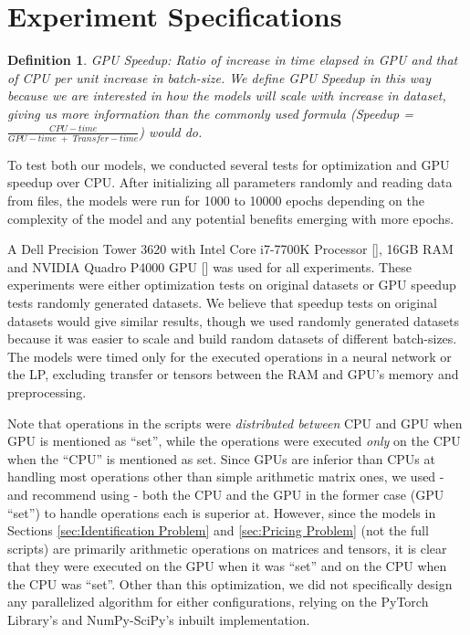 \documentclass[12pt]{article}
\newtheorem{mydef}{Definition}
\begin{document}
    \section{Experiment Specifications} \label{sec:Experiment Specifications}
    \begin{mydef} \label{def:GPU Speedup}
        GPU Speedup: Ratio of increase in time elapsed in GPU and that of CPU per unit increase in batch-size. We define GPU Speedup in this way because we are interested in how the models will scale with increase in dataset, giving us more information than the commonly used formula (Speedup = $\frac{CPU-time}{GPU-time\; +\; Transfer-time}$) would do.
    \end{mydef}
    To test both our models, we conducted several tests for optimization and GPU speedup over CPU. After initializing all parameters randomly and reading data from files, the models were run for 1000 to 10000 epochs depending on the complexity of the model and any potential benefits emerging with more epochs.
    
    A Dell Precision Tower 3620 with Intel Core i7-7700K Processor [], 16GB RAM and NVIDIA Quadro P4000 GPU [] was used for all experiments. These experiments were either optimization tests on original datasets or GPU speedup tests randomly generated datasets. We believe that speedup tests on original datasets would give similar results, though we used randomly generated datasets because it was easier to scale and build random datasets of different batch-sizes. The models were timed only for the executed operations in a neural network or the LP, excluding transfer or tensors between the RAM and GPU's memory and preprocessing.
    
    Note that operations in the scripts were \textit{distributed between} CPU and GPU when GPU is mentioned as ``set'', while the operations were executed \textit{only} on the CPU when the ``CPU'' is mentioned as set. Since GPUs are inferior than CPUs at handling most operations other than simple arithmetic matrix ones, we used - and recommend using - both the CPU and the GPU in the former case (GPU ``set'') to handle operations each is superior at. However, since the models in Sections \ref{sec:Identification Problem} and \ref{sec:Pricing Problem} (not the full scripts) are primarily arithmetic operations on matrices and tensors, it is clear that they were executed on the GPU when it was ``set'' and on the CPU when the CPU was ``set''. Other than this optimization, we did not specifically design any parallelized algorithm for either configurations, relying on the PyTorch Library's and NumPy-SciPy's inbuilt implementation.
    
\end{document}
